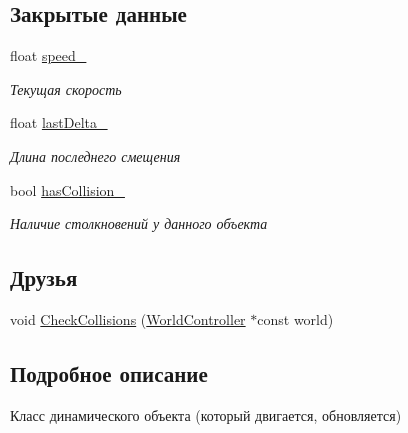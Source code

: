 \subsection*{Закрытые данные}
\begin{DoxyCompactItemize}
\item 
\mbox{\label{classrtm_1_1_dynamic_object_a3bb8542efacb7c256d6a60fb5e022916}} 
float \hyperlink{classrtm_1_1_dynamic_object_a3bb8542efacb7c256d6a60fb5e022916}{speed\+\_\+}
\begin{DoxyCompactList}\small\item\em Текущая скорость \end{DoxyCompactList}\item 
\mbox{\label{classrtm_1_1_dynamic_object_af325931cad8f3256cbda0c08f22cc004}} 
float \hyperlink{classrtm_1_1_dynamic_object_af325931cad8f3256cbda0c08f22cc004}{last\+Delta\+\_\+}
\begin{DoxyCompactList}\small\item\em Длина последнего смещения \end{DoxyCompactList}\item 
\mbox{\label{classrtm_1_1_dynamic_object_a05fe95cdc787c012fe36584398e82428}} 
bool \hyperlink{classrtm_1_1_dynamic_object_a05fe95cdc787c012fe36584398e82428}{has\+Collision\+\_\+}
\begin{DoxyCompactList}\small\item\em Наличие столкновений у данного объекта \end{DoxyCompactList}\end{DoxyCompactItemize}
\subsection*{Друзья}
\begin{DoxyCompactItemize}
\item 
void \hyperlink{classrtm_1_1_dynamic_object_af73a5c4922e4f77fba3e44898bfa308b}{Check\+Collisions} (\hyperlink{classrtm_1_1_world_controller}{World\+Controller} $\ast$const world)
\end{DoxyCompactItemize}


\subsection{Подробное описание}
Класс динамического объекта (который двигается, обновляется) 

